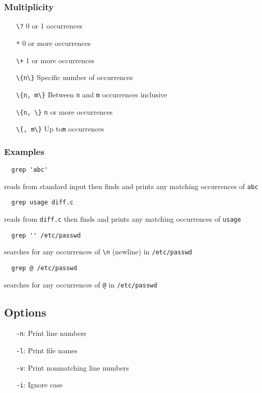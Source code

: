 \documentclass[13pt]{article}
\begin{document}
\subsubsection{Multiplicity}
\begin{itemize}[label=]
\item [\texttt{\textbackslash?}] 0 or 1 occurrences
\item [\texttt{*}] 0 or more occurrences
\item [\texttt{\textbackslash+}] 1 or more occurrences
\item [\texttt{\textbackslash\{n\textbackslash\}}] Specific number of occurrences
\item [\texttt{\textbackslash\{n, m\textbackslash\}}] Between \texttt{n} and \texttt{m} occurrences inclusive
\item [\texttt{\textbackslash\{n, \textbackslash\}}] \texttt{n} or more occurrences
\item [\texttt{\textbackslash\{, m\textbackslash\}}] Up to\texttt{m} occurrences
\end{itemize}

\subsubsection*{Examples}
\begin{verbatim}
  grep 'abc' \end{verbatim}
reads from standard input then finds and prints any matching occurrences of \texttt{abc}
\begin{verbatim}
  grep usage diff.c \end{verbatim}
reads from \texttt{diff.c} then finds and prints any matching occurrences of \texttt{usage}
\begin{verbatim}
  grep '' /etc/passwd \end{verbatim}
searches for any occurrences of \texttt{\textbackslash n} (newline) in \texttt{/etc/passwd}
\begin{verbatim}
  grep @ /etc/passwd \end{verbatim}
searches for any occurrences of \texttt{@} in \texttt{/etc/passwd}
\subsection{Options}
\begin{itemize}[leftmargin = 0pt]
\item [] \texttt{-n}: Print line numbers
\item [] \texttt{-l}: Print file names
\item [] \texttt{-v}: Print nonmatching line numbers
\item [] \texttt{-i}: Ignore case
\end{itemize}
\end{document}
